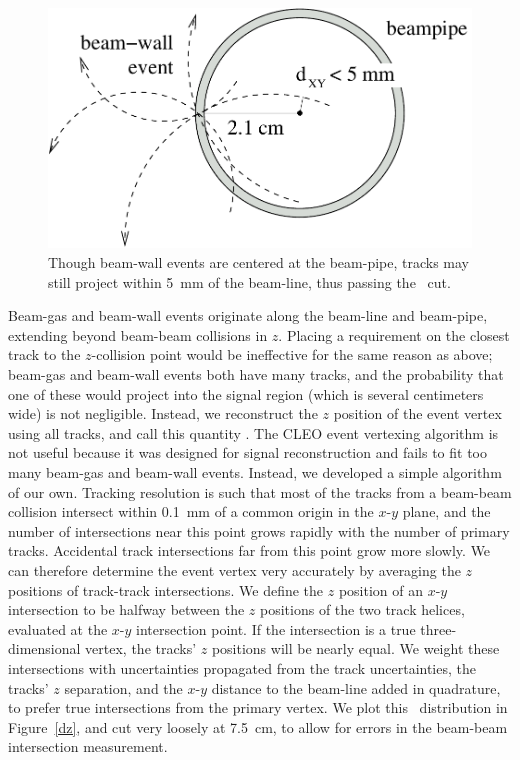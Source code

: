 \documentclass{cornell}
\begin{document}
\begin{figure}[t]
  \begin{center}
    \includegraphics[width=0.6\linewidth]{newplots/biastowardzero}
  \end{center}
  \caption[How beam-wall events project tracks within 5~mm of the
  beam-line]{\label{biastowardzero} Though beam-wall events are
  centered at the beam-pipe, tracks may still project within 5~mm of
  the beam-line, thus passing the \dxy\ cut.}
\end{figure}

Beam-gas and beam-wall events originate along the beam-line and
beam-pipe, extending beyond beam-beam collisions in $z$.  Placing a
requirement on the closest track to the $z$-collision point would be
ineffective for the same reason as above; beam-gas and beam-wall
events both have many tracks, and the probability that one of these
would project into the signal region (which is several centimeters
wide) is not negligible.  Instead, we reconstruct the $z$ position of
the event vertex using all tracks, and call this quantity \dz.  The
CLEO event vertexing algorithm is not useful because it was designed
for signal reconstruction and fails to fit too many beam-gas and
beam-wall events.  Instead, we developed a simple algorithm of our
own.  Tracking resolution is such that most of the tracks from a
beam-beam collision intersect within 0.1~mm of a common origin in the
$x$-$y$ plane, and the number of intersections near this point grows
rapidly with the number of primary tracks.  Accidental track
intersections far from this point grow more slowly.  We can therefore
determine the event vertex very accurately by averaging the $z$
positions of track-track intersections.  We define the $z$ position of
an $x$-$y$ intersection to be halfway between the $z$ positions of the
two track helices, evaluated at the $x$-$y$ intersection point.  If
the intersection is a true three-dimensional vertex, the tracks' $z$
positions will be nearly equal.  We weight these intersections with
uncertainties propagated from the track uncertainties, the tracks' $z$
separation, and the $x$-$y$ distance to the beam-line added in
quadrature, to prefer true intersections from the primary vertex.  We
plot this \dz\ distribution in Figure~\ref{dz}, and cut very loosely
at 7.5~cm, to allow for errors in the beam-beam intersection
measurement.
\end{document}
